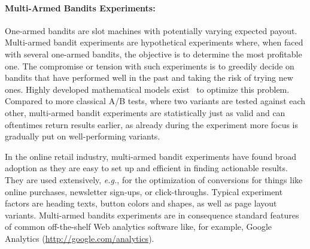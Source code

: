 \paragraph{Multi-Armed Bandits Experiments:}

One-armed bandits are slot machines
with potentially varying expected payout.
Multi-armed bandit experiments are hypothetical experiments
where, when faced with several one-armed bandits,
the objective is to determine the most profitable one.
The compromise or tension with such experiments is to
greedily decide on bandits that have performed well in the past
and taking the risk of trying new ones.
Highly developed mathematical models exist~\cite{scott2010bandits}
to optimize this problem.
Compared to more classical A/B tests, where two variants 
are tested against each other, multi-armed bandit experiments
are statistically just as valid and can oftentimes return results earlier, as already during the experiment
more focus is gradually put on well-performing variants.

In the online retail industry, multi-armed bandit experiments
have found broad adoption as they are easy to set up and efficient in finding actionable results.
They are used extensively, \emph{e.g.}, for the optimization 
of conversions for things like
online purchases, newsletter sign-ups, or click-throughs.
Typical experiment factors are heading texts, button colors and shapes,
as well as page layout variants.
Multi-armed bandits experiments are in consequence standard features
of common off-the-shelf Web analytics software like, for example,
Google Analytics (\url{http://google.com/analytics}).

